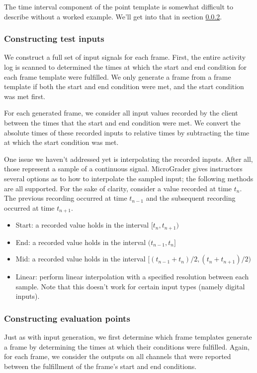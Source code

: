 \documentclass[12pt]{article}
\begin{document}
The time interval component of the point template is somewhat difficult to describe without a worked example.  We'll get into that in section \ref{sec:using-point-templates}.

\subsubsection{Constructing test inputs}
We construct a full set of input signals for each frame. First, the entire activity log is scanned to determined the times at which the start and end condition for each frame template were fulfilled.  We only generate a frame from a frame template if both the start and end condition were met, and the start condition was met first.

For each generated frame, we consider all input values recorded by the client between the times that the start and end condition were met.  We convert the absolute times of these recorded inputs to relative times by subtracting the time at which the start condition was met.

One issue we haven't addressed yet is interpolating the recorded inputs.  After all, those represent a sample of a continuous signal.  MicroGrader gives instructors several options as to how to interpolate the sampled input; the following methods are all supported.  For the sake of clarity, consider a value recorded at time $t_n$.  The previous recording occurred at time $t_{n-1}$ and the subsequent recording occurred at time $t_{n+1}$.

\begin{itemize}
\item Start: a recorded value holds in the interval $[t_n, t_{n+1})$
\item End: a recorded value holds in the interval $(t_{n-1}, t_n]$
\item Mid: a recorded value holds in the interval $[(t_{n-1} + t_n)/2, (t_n + t_{n+1})/2)$
\item Linear: perform linear interpolation with a specified resolution between each sample.  Note that this doesn't work for certain input types (namely digital inputs).
\end{itemize}

\subsubsection{Constructing evaluation points}
\label{sec:using-point-templates}
Just as with input generation, we first determine which frame templates generate a frame by determining the times at which their conditions were fulfilled.  Again, for each frame, we consider the outputs on all channels that were reported between the fulfillment of the frame's start and end conditions.
\end{document}
